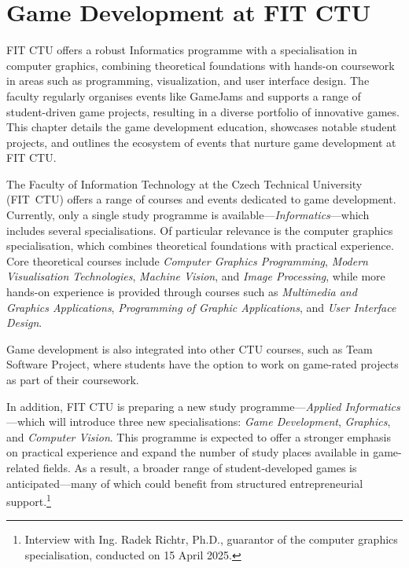 \chapter{Game Development at FIT CTU}

\begin{chapterabstract}	
    FIT CTU offers a robust Informatics programme with a specialisation in computer graphics, combining theoretical foundations with hands-on coursework in areas such as programming, visualization, and user interface design. The faculty regularly organises events like GameJams and supports a range of student-driven game projects, resulting in a diverse portfolio of innovative games. This chapter details the game development education, showcases notable student projects, and outlines the ecosystem of events that nurture game development at FIT CTU.
\end{chapterabstract}

The Faculty of Information Technology at the Czech Technical University (FIT~CTU) offers a range of courses and events dedicated to game development. Currently, only a single study programme is available---\textit{Informatics}---which includes several specialisations. Of particular relevance is the computer graphics specialisation, which combines theoretical foundations with practical experience. Core theoretical courses include \textit{Computer Graphics Programming}, \textit{Modern Visualisation Technologies}, \textit{Machine Vision}, and \textit{Image Processing}, while more hands-on experience is provided through courses such as \textit{Multimedia and Graphics Applications}, \textit{Programming of Graphic Applications}, and \textit{User Interface Design}.
\cite{fit_graphics}

Game development is also integrated into other CTU courses, such as Team Software Project, where students have the option to work on game-rated projects as part of their coursework.
\cite{FIT_courses}

In addition, FIT CTU is preparing a new study programme---\textit{Applied Informatics}---which will introduce three new specialisations: \textit{Game Development}, \textit{Graphics}, and \textit{Computer Vision}. This programme is expected to offer a stronger emphasis on practical experience and expand the number of study places available in game-related fields. As a result, a broader range of student-developed games is anticipated---many of which could benefit from structured entrepreneurial support.\footnote{Interview with Ing. Radek Richtr, Ph.D., guarantor of the computer graphics specialisation, conducted on 15 April 2025.}

